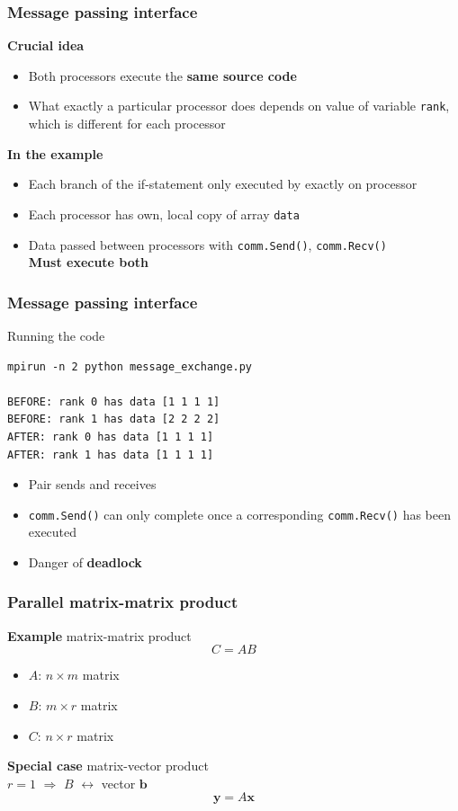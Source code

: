 \documentclass{beamer}
\renewcommand{\vec}[1]{\boldsymbol{#1}}
\begin{document}

\begin{frame}[fragile]
  \frametitle{Message passing interface}
  \textbf{Crucial idea}
  \begin{itemize}
    \item Both processors execute the \textbf{same source code}
    \item What exactly a particular processor does depends on value of variable \lstinline{rank}, which is different for each processor
  \end{itemize}
  \textbf{In the example}
  \begin{itemize}
  \item Each branch of the if-statement only executed by exactly on processor
  \item Each processor has own, local copy of array \lstinline{data}
  \item Data passed between processors with \lstinline{comm.Send()}, \lstinline{comm.Recv()}\\
    \textbf{Must execute both}
  \end{itemize}
\end{frame}


\begin{frame}[fragile]
  \frametitle{Message passing interface}
Running the code
\begin{verbatim}
mpirun -n 2 python message_exchange.py

BEFORE: rank 0 has data [1 1 1 1]
BEFORE: rank 1 has data [2 2 2 2]
AFTER: rank 0 has data [1 1 1 1]
AFTER: rank 1 has data [1 1 1 1]
\end{verbatim}
\begin{itemize}
  \item Pair sends and receives
\item \lstinline{comm.Send()} can only complete once a corresponding \lstinline{comm.Recv()} has been executed
\item Danger of \textbf{deadlock}
\end{itemize}
\end{frame}


\begin{frame}
  \frametitle{Parallel matrix-matrix product}
  \textbf{Example} matrix-matrix product
  $$C=AB$$
  \begin{itemize}
  \item $A$: $n\times m$ matrix
  \item $B$: $m\times r$ matrix
  \item $C$: $n\times r$ matrix
  \end{itemize}
  \textbf{Special case} matrix-vector product\\
  $r=1$ $\Rightarrow$ $B$ $\leftrightarrow$ vector $\vec{b}$
  $$\boldsymbol{y}=A\boldsymbol{x}$$
\end{frame}
\end{document}
